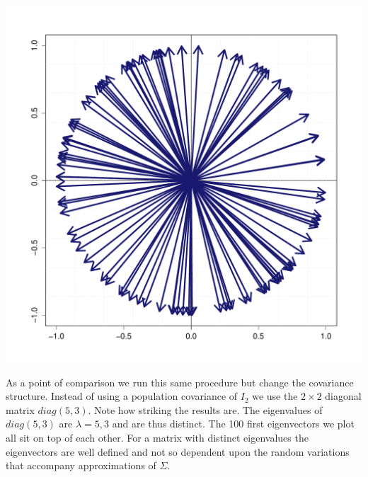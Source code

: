 \documentclass{book}
\begin{document}
\begin{center}
\includegraphics[scale=.3]{./Figures/arbEigen.pdf}%
\end{center}

As a point of comparison we run this same procedure but change the covariance structure. Instead of using a population covariance of $I_2$ we use the $2\times 2$ diagonal matrix $diag(5,3)$. Note how striking the results are. The eigenvalues of $diag(5,3)$ are $\lambda=5,3$ and are thus distinct. The 100 first eigenvectors we plot all sit on top of each other. For a matrix with distinct eigenvalues the eigenvectors are well defined and not so dependent upon the random variations that accompany approximations of $\Sigma$.
\end{document}
